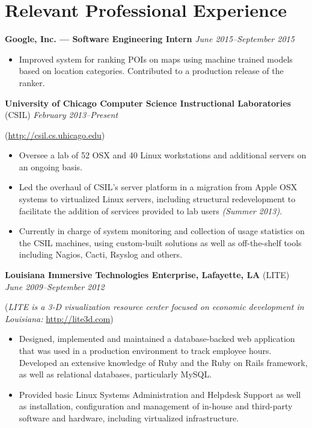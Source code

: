 \documentclass[10pt,letterpaper]{article} %
\begin{document}
    \section*{Relevant Professional Experience} 
        \textbf{Google, Inc. --- Software Engineering Intern} \hfill \textit{June 2015--September 2015} 
            \begin{itemize} 
            \item Improved system for ranking POIs on maps using machine trained models based on location categories. Contributed to a production release of the ranker.
            \end{itemize} 
            \vspace{1em}
        \textbf{University of Chicago Computer Science Instructional Laboratories} (CSIL) \hfill \textit{February 2013--Present }
            \begin{footnotesize}
                (\url{http://csil.cs.uhicago.edu})
            \end{footnotesize}
            \begin{itemize}
            \item Oversee a lab of 52 OSX and 40 Linux workstations and additional servers on an ongoing basis.
            \item Led the overhaul of CSIL's server platform in a migration from Apple OSX systems to virtualized Linux servers, including structural redevelopment to facilitate the addition of services provided to lab users \textit{(Summer 2013)}. 
            \item Currently in charge of system monitoring and collection of usage statistics on the CSIL machines, using custom-built solutions as well as off-the-shelf tools including Nagios, Cacti, Rsyslog and others. 
            \end{itemize}
            \vspace{1em}

        \textbf{Louisiana Immersive Technologies Enterprise, Lafayette, LA} (LITE) \hfill \textit{June 2009--September 2012} 

            \begin{footnotesize}
                (\textit{LITE is a 3-D visualization resource center focused on economic development in Louisiana: }\url{http://lite3d.com})
            \end{footnotesize}
            \begin{itemize} 
            \item  Designed, implemented and maintained a database-backed web application that was used in a production environment to track 
                   employee hours. Developed an extensive knowledge of Ruby and the 
                   Ruby on Rails framework, as well as relational databases, particularly MySQL.
            \item  Provided basic Linux Systems Administration and Helpdesk Support as well as installation, configuration and 
                   management of in-house and third-party software and hardware, including virtualized infrastructure.
            \end{itemize} 
\end{document}
